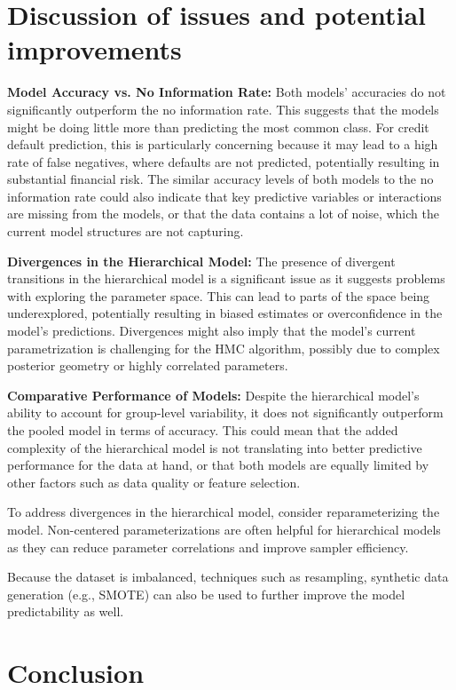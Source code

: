 \documentclass[a4paper]{artikel3}
\begin{document}
\section{Discussion of issues and potential improvements}

\textbf{Model Accuracy vs. No Information Rate:}
Both models' accuracies do not significantly outperform the no information rate. This suggests that the models might be doing little more than predicting the most common class. For credit default prediction, this is particularly concerning because it may lead to a high rate of false negatives, where defaults are not predicted, potentially resulting in substantial financial risk.
The similar accuracy levels of both models to the no information rate could also indicate that key predictive variables or interactions are missing from the models, or that the data contains a lot of noise, which the current model structures are not capturing.

\textbf{Divergences in the Hierarchical Model:}
The presence of divergent transitions in the hierarchical model is a significant issue as it suggests problems with exploring the parameter space. This can lead to parts of the space being underexplored, potentially resulting in biased estimates or overconfidence in the model's predictions.
Divergences might also imply that the model's current parametrization is challenging for the HMC algorithm, possibly due to complex posterior geometry or highly correlated parameters.

\textbf{Comparative Performance of Models:}
Despite the hierarchical model's ability to account for group-level variability, it does not significantly outperform the pooled model in terms of accuracy. This could mean that the added complexity of the hierarchical model is not translating into better predictive performance for the data at hand, or that both models are equally limited by other factors such as data quality or feature selection.

To address divergences in the hierarchical model, consider reparameterizing the model. Non-centered parameterizations are often helpful for hierarchical models as they can reduce parameter correlations and improve sampler efficiency.

Because the dataset is imbalanced, techniques such as resampling, synthetic data generation (e.g., SMOTE) can also be used to further improve the model predictability as well.
\section{Conclusion}
\end{document}
